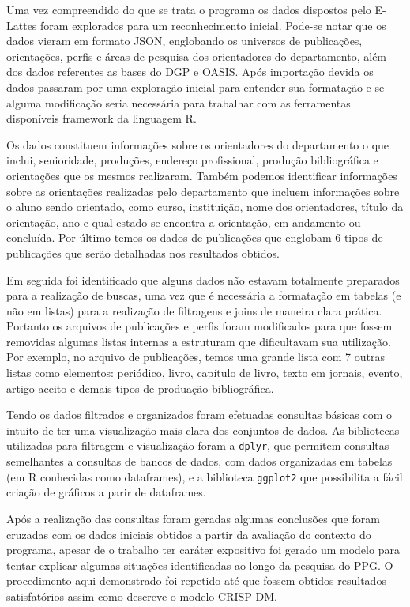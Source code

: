 \documentclass[]{article}
\begin{document}
Uma vez compreendido do que se trata o programa os dados dispostos pelo
E-Lattes foram explorados para um reconhecimento inicial. Pode-se notar
que os dados vieram em formato JSON, englobando os universos de
publicações, orientações, perfis e áreas de pesquisa dos orientadores do
departamento, além dos dados referentes as bases do DGP e OASIS. Após
importação devida os dados passaram por uma exploração inicial para
entender sua formatação e se alguma modificação seria necessária para
trabalhar com as ferramentas disponíveis framework da linguagem R.

Os dados constituem informações sobre os orientadores do departamento o
que inclui, senioridade, produções, endereço profissional, produção
bibliográfica e orientações que os mesmos realizaram. Também podemos
identificar informações sobre as orientações realizadas pelo
departamento que incluem informações sobre o aluno sendo orientado, como
curso, instituição, nome dos orientadores, título da orientação, ano e
qual estado se encontra a orientação, em andamento ou concluída. Por
último temos os dados de publicações que englobam 6 tipos de publicações
que serão detalhadas nos resultados obtidos.

Em seguida foi identificado que alguns dados não estavam totalmente
preparados para a realização de buscas, uma vez que é necessária a
formatação em tabelas (e não em listas) para a realização de filtragens
e joins de maneira clara prática. Portanto os arquivos de publicações e
perfis foram modificados para que fossem removidas algumas listas
internas a estruturam que dificultavam sua utilização. Por exemplo, no
arquivo de publicações, temos uma grande lista com 7 outras listas como
elementos: periódico, livro, capítulo de livro, texto em jornais,
evento, artigo aceito e demais tipos de produação bibliográfica.

Tendo os dados filtrados e organizados foram efetuadas consultas básicas
com o intuito de ter uma visualização mais clara dos conjuntos de dados.
As bibliotecas utilizadas para filtragem e visualização foram a
\texttt{dplyr}, que permitem consultas semelhantes a consultas de bancos
de dados, com dados organizadas em tabelas (em R conhecidas como
dataframes), e a biblioteca \texttt{ggplot2} que possibilita a fácil
criação de gráficos a parir de dataframes.

Após a realização das consultas foram geradas algumas conclusões que
foram cruzadas com os dados iniciais obtidos a partir da avaliação do
contexto do programa, apesar de o trabalho ter caráter expositivo foi
gerado um modelo para tentar explicar algumas situações identificadas ao
longo da pesquisa do PPG. O procedimento aqui demonstrado foi repetido
até que fossem obtidos resultados satisfatórios assim como descreve o
modelo CRISP-DM.
\end{document}
